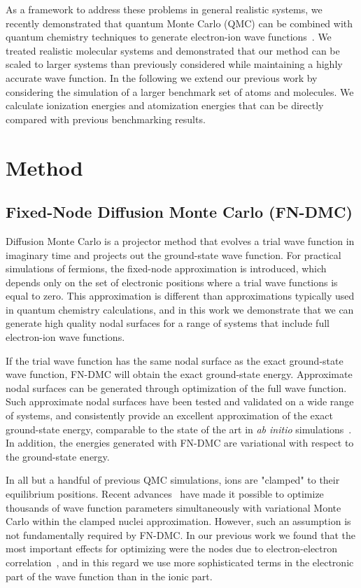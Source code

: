 \documentclass[pra,superscriptaddress,groupedaddress,twocolumn]{revtex4}
\begin{document}
As a framework to address these problems in general realistic systems, we recently demonstrated that quantum Monte Carlo (QMC) can be combined with quantum chemistry techniques to generate electron-ion wave functions~\cite{Tubman_ECG}.  We treated realistic molecular systems and demonstrated that our method can be scaled to larger systems than previously considered while maintaining a highly accurate wave function. In the following we extend our previous work by considering the simulation of a larger benchmark set of atoms and molecules.  We calculate ionization energies and atomization energies that can be directly compared with previous benchmarking results.

\section{Method}
\subsection{Fixed-Node Diffusion Monte Carlo (FN-DMC)}
Diffusion Monte Carlo is a projector method that evolves a trial wave function in imaginary time and projects out the ground-state wave function.  For practical simulations of fermions, the fixed-node approximation is introduced, which depends only on the set of electronic positions where a trial wave functions is equal to zero.  This approximation is different than approximations typically used in quantum chemistry calculations, and in this work we demonstrate that we can generate high quality nodal surfaces for a range of systems that include full electron-ion wave functions. 

If the trial wave function has the same nodal surface as the exact ground-state wave function, FN-DMC will obtain the exact ground-state energy.  Approximate nodal surfaces can be generated through optimization of the full wave function. Such approximate nodal surfaces have been tested and validated on a wide range of systems, and consistently provide an excellent approximation of the exact ground-state energy,  comparable to the state of the art in \textit{ab initio} simulations~\cite{grossman1}. In addition, the energies generated with FN-DMC are variational with respect to the ground-state energy.

In all but a handful of previous QMC simulations, ions are "clamped" to their equilibrium positions. Recent advances~\cite{Nightingale_Linear,Umrigar_Linear,Brown_Bench} have made it possible to optimize thousands of wave function parameters simultaneously with variational Monte Carlo within the clamped nuclei approximation. However, such an assumption is not fundamentally required by FN-DMC.  In our previous work we found that the most important effects for optimizing were the nodes due to electron-electron correlation~\cite{Tubman_ECG}, and in this regard we use more sophisticated terms in the electronic part of the wave function than in the ionic part.
\end{document}
